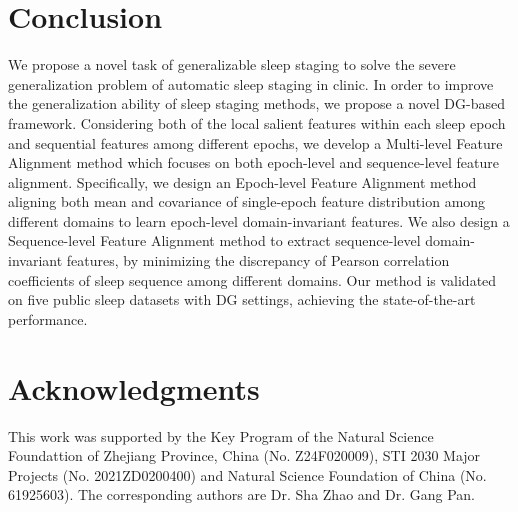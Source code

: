 \documentclass[letterpaper]{article} %
\begin{document}
	\section{Conclusion}
	We propose a novel task of generalizable sleep staging to solve the severe generalization problem of automatic sleep staging in clinic. In order to improve the generalization ability of sleep staging methods, we propose a novel DG-based framework. Considering both of the local salient features within each sleep epoch and sequential features among different epochs, we develop a Multi-level Feature Alignment method which focuses on both epoch-level and sequence-level feature alignment. Specifically, we design an Epoch-level Feature Alignment method aligning both mean and covariance of single-epoch feature distribution among different domains to learn epoch-level domain-invariant features. We also design a Sequence-level Feature Alignment method to extract sequence-level domain-invariant features, by minimizing the discrepancy of Pearson correlation coefficients of sleep sequence among different domains. 
	Our method is validated on five public sleep datasets with DG settings, achieving the state-of-the-art performance.
	
	\section{Acknowledgments}
	This work was supported by the Key Program of the Natural Science Foundattion of Zhejiang Province, China (No. Z24F020009), STI 2030 Major Projects (No. 2021ZD0200400) and Natural Science Foundation of China (No. 61925603).
	The corresponding authors are Dr. Sha  Zhao and Dr. Gang Pan.
	
	
\end{document}
